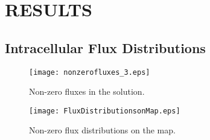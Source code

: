 \chapter{RESULTS}
\section{Intracellular Flux Distributions}
\begin{figure}[H]
  \texttt{[image: nonzerofluxes\_3.eps]}
  \caption[Non-zero fluxes in the solution]{Non-zero fluxes in the solution.}
\label{fig:nonzerofluxes}
\end{figure}


\begin{figure}[H]
  \texttt{[image: FluxDistributionsonMap.eps]}
  \caption[Map view of the non-zero flux distributions]{Non-zero flux distributions on the map.}
\label{fig:fluxesonmap}
\end{figure}
